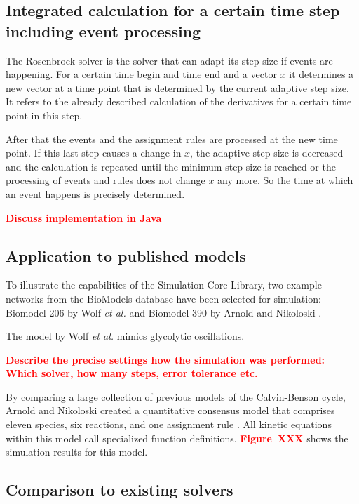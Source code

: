 \documentclass[10pt]{bmc_article}
\newenvironment{bmcformat}{\baselineskip20pt\sloppy\setboolean{publ}{false}}{\baselineskip20pt\sloppy}
\newcommand{\TODO}[1]{\textcolor{red}{\textbf{#1}}}
\begin{document}
\begin{bmcformat}
\subsection{Integrated calculation for a certain time step including event processing}
The Rosenbrock solver is the solver that can adapt its step size if events are happening. For a certain time begin and time end and a vector $x$ it determines a new vector at a time point that is determined by the current adaptive step size. It refers to the already described calculation of the derivatives for a certain time point in this step.

After that the events and the assignment rules are processed at the new time point. If this last step causes a change in $x$, the adaptive step size is decreased and the calculation is repeated until the minimum step size is reached or the processing of events and rules does not change $x$ any more. So the time at which an event happens is precisely determined.

\TODO{Discuss implementation in Java}

\subsection{Application to published models}

To illustrate the capabilities of the Simulation Core Library, two example
networks from the BioModels database have been selected for simulation:
Biomodel 206 by Wolf \emph{et al.} \cite{Wolf2000} and
Biomodel 390 by Arnold and Nikoloski \cite{Arnold2011}.

The model by Wolf \emph{et al.} \cite{Wolf2000} mimics glycolytic oscillations.

\TODO{Describe the precise settings how the simulation was performed: Which
solver, how many steps, error tolerance etc.}

By comparing a large collection of previous models of the Calvin-Benson
cycle, Arnold and Nikoloski created a quantitative consensus model that
comprises eleven species, six reactions, and one assignment rule
\cite{Arnold2011}.
All kinetic equations within this model call specialized function definitions.
\TODO{Figure~XXX} shows the simulation results for this model.

\subsection{Comparison to existing solvers}


\end{bmcformat}
\end{document}
